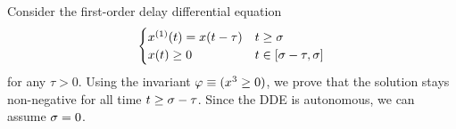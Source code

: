         \begin{example}
            Consider the first-order delay differential equation
            \begin{equation*}
                \begin{cases}
                    \D{x}(t) = x(t-\tau) & t \geq \tzero\\
                    x(t) \geq 0 & t \in [\tzero-\tau,\tzero]
                \end{cases}
            \end{equation*}
            for any $\tau>0$.
            Using the invariant $\varphi\equiv(x^3\geq 0)$, we prove that the solution stays non-negative for all time $t\geq\sigma-\tau$.
            Since the DDE is autonomous, we can assume $\sigma=0$.
            \footnotesize
            \begin{sequentdeduction}
\end{sequentdeduction}
\end{example}
